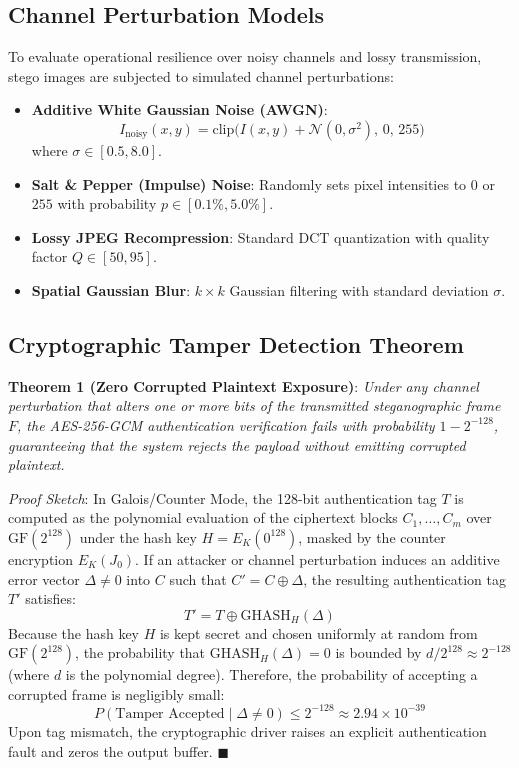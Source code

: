\documentclass[conference]{IEEEtran}
\begin{document}
\subsection{Channel Perturbation Models}
To evaluate operational resilience over noisy channels and lossy transmission, stego images are subjected to simulated channel perturbations:
\begin{itemize}
    \item \textbf{Additive White Gaussian Noise (AWGN)}:
    \begin{equation}
        I_{\text{noisy}}(x, y) = \text{clip}\Big(I(x, y) + \mathcal{N}(0, \sigma^2), \, 0, \, 255\Big)
    \end{equation}
    where $\sigma \in [0.5, 8.0]$.
    \item \textbf{Salt \& Pepper (Impulse) Noise}: Randomly sets pixel intensities to $0$ or $255$ with probability $p \in [0.1\%, 5.0\%]$.
    \item \textbf{Lossy JPEG Recompression}: Standard DCT quantization with quality factor $Q \in [50, 95]$.
    \item \textbf{Spatial Gaussian Blur}: $k \times k$ Gaussian filtering with standard deviation $\sigma$.
\end{itemize}

\subsection{Cryptographic Tamper Detection Theorem}
\textbf{Theorem 1 (Zero Corrupted Plaintext Exposure)}: \textit{Under any channel perturbation that alters one or more bits of the transmitted steganographic frame $F$, the AES-256-GCM authentication verification fails with probability $1 - 2^{-128}$, guaranteeing that the system rejects the payload without emitting corrupted plaintext.}

\textit{Proof Sketch}: In Galois/Counter Mode, the 128-bit authentication tag $T$ is computed as the polynomial evaluation of the ciphertext blocks $C_1, \dots, C_m$ over $\text{GF}(2^{128})$ under the hash key $H = E_K(0^{128})$, masked by the counter encryption $E_K(J_0)$. If an attacker or channel perturbation induces an additive error vector $\Delta \ne 0$ into $C$ such that $C' = C \oplus \Delta$, the resulting authentication tag $T'$ satisfies:
\begin{equation}
    T' = T \oplus \text{GHASH}_H(\Delta)
\end{equation}
Because the hash key $H$ is kept secret and chosen uniformly at random from $\text{GF}(2^{128})$, the probability that $\text{GHASH}_H(\Delta) = 0$ is bounded by $d / 2^{128} \approx 2^{-128}$ (where $d$ is the polynomial degree). Therefore, the probability of accepting a corrupted frame is negligibly small:
\begin{equation}
    P(\text{Tamper Accepted} \mid \Delta \ne 0) \le 2^{-128} \approx 2.94 \times 10^{-39}
\end{equation}
Upon tag mismatch, the cryptographic driver raises an explicit authentication fault and zeros the output buffer. $\blacksquare$
\end{document}
